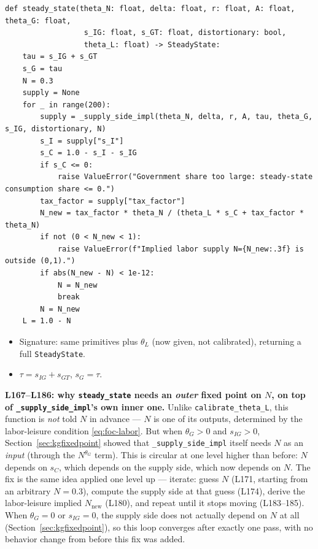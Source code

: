 \documentclass[11pt]{article}
\begin{document}
\begin{lstlisting}[firstnumber=160]
def steady_state(theta_N: float, delta: float, r: float, A: float, theta_G: float,
                  s_IG: float, s_GT: float, distortionary: bool,
                  theta_L: float) -> SteadyState:
    tau = s_IG + s_GT
    s_G = tau
    N = 0.3
    supply = None
    for _ in range(200):
        supply = _supply_side_impl(theta_N, delta, r, A, tau, theta_G, s_IG, distortionary, N)
        s_I = supply["s_I"]
        s_C = 1.0 - s_I - s_IG
        if s_C <= 0:
            raise ValueError("Government share too large: steady-state consumption share <= 0.")
        tax_factor = supply["tax_factor"]
        N_new = tax_factor * theta_N / (theta_L * s_C + tax_factor * theta_N)
        if not (0 < N_new < 1):
            raise ValueError(f"Implied labor supply N={N_new:.3f} is outside (0,1).")
        if abs(N_new - N) < 1e-12:
            N = N_new
            break
        N = N_new
    L = 1.0 - N
\end{lstlisting}
\begin{itemize}
\item[\textbf{L160--L162}] Signature: same primitives plus $\theta_L$ (now
given, not calibrated), returning a full \texttt{SteadyState}.
\item[\textbf{L165--L166}] $\tau=s_{IG}+s_{GT}$, $s_G=\tau$.
\end{itemize}

\begin{notebox}
\textbf{L167--L186: why \texttt{steady\_state} needs an \emph{outer} fixed
point on $N$, on top of \texttt{\_supply\_side\_impl}'s own inner one.}
Unlike \texttt{calibrate\_theta\_L}, this function is \emph{not} told $N$
in advance --- $N$ is one of its outputs, determined by the labor-leisure
condition \eqref{eq:foc-labor}. But when $\theta_G>0$ and $s_{IG}>0$,
Section~\ref{sec:kgfixedpoint} showed that \texttt{\_supply\_side\_impl}
itself needs $N$ as an \emph{input} (through the $N^{\theta_G}$ term). This
is circular at one level higher than before: $N$ depends on $s_C$, which
depends on the supply side, which now depends on $N$. The fix is the same
idea applied one level up --- iterate: guess $N$ (L171, starting from an
arbitrary $N=0.3$), compute the supply side at that guess (L174), derive
the labor-leisure implied $N_{\text{new}}$ (L180), and repeat until it
stops moving (L183--185). When $\theta_G=0$ or $s_{IG}=0$, the supply side
does not actually depend on $N$ at all (Section~\ref{sec:kgfixedpoint}),
so this loop converges after exactly one pass, with no behavior change
from before this fix was added.
\end{notebox}
\end{document}
